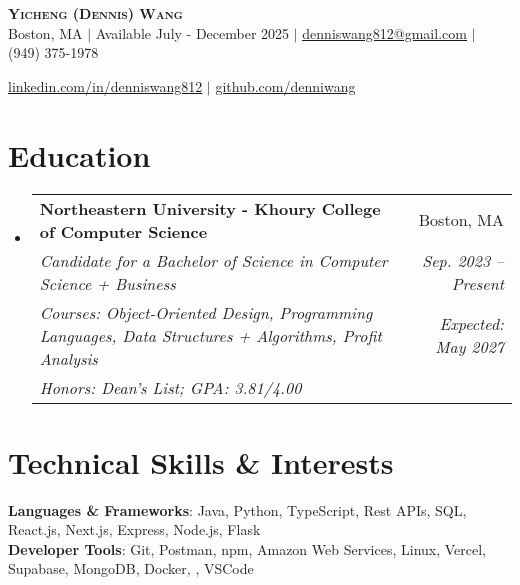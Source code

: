 \documentclass[letterpaper,11pt]{article}
\makeatletter
\newcommand{\eduSubheading}[7]{
  \vspace{-2pt}\item
    \begin{tabular*}{0.97\textwidth}[t]{l@{\extracolsep{\fill}}r}
      \textbf{#1} & #2 \\
      \vspace{-2pt}
      \textit{\small#3} & \hspace{-10cm}\textit{\small #4} \\
      \vspace{-2pt}
      \textit{\footnotesize#5}&\textit{\small #6} \\
      
      \textit{\footnotesize#7}
    \end{tabular*}\vspace{-6pt}
}
\newcommand{\resumeSubHeadingListStart}{\begin{itemize}[leftmargin=0.15in, label={}]}
\newcommand{\resumeSubHeadingListEnd}{\end{itemize}}
\makeatother
\begin{document}

\begin{center}
\textbf{\Huge \scshape Yicheng (Dennis) Wang} \\ \vspace{1pt}
\small Boston, MA  $|$ Available July - December 2025 $|$ \href{mailto:denniswang812@gmail.com}{\underline{denniswang812@gmail.com}} $|$ (949) 375-1978 

\href{https://www.linkedin.com/in/denniswang812/}{\underline{linkedin.com/in/denniswang812}} $|$ \href{https://github.com/denniwang}{\underline{github.com/denniwang}} 
\end{center} 


\section{Education}
  \resumeSubHeadingListStart
    \eduSubheading
      {Northeastern University - Khoury College of Computer Science}{Boston, MA}
      {Candidate for a Bachelor of Science in Computer Science + Business} {Sep. 2023 -- Present}
       {Courses: Object-Oriented Design, Programming Languages, Data Structures + Algorithms, Profit Analysis}{Expected: May 2027}
       {Honors: Dean's List; GPA: 3.81/4.00}
  \resumeSubHeadingListEnd


\section{Technical Skills \& Interests}
 \begin{itemize}[leftmargin=0.15in, label={}]
    \small{\item{
     \textbf{Languages \& Frameworks}{: Java, Python, TypeScript, Rest APIs, SQL, React.js, Next.js, Express, Node.js, Flask} \\
     \textbf{Developer Tools}{: Git, Postman, npm, Amazon Web Services, Linux, Vercel, Supabase, MongoDB, Docker, , VSCode} \\

     \vspace{-5pt}
    }}
    
 \end{itemize}

\end{document}

